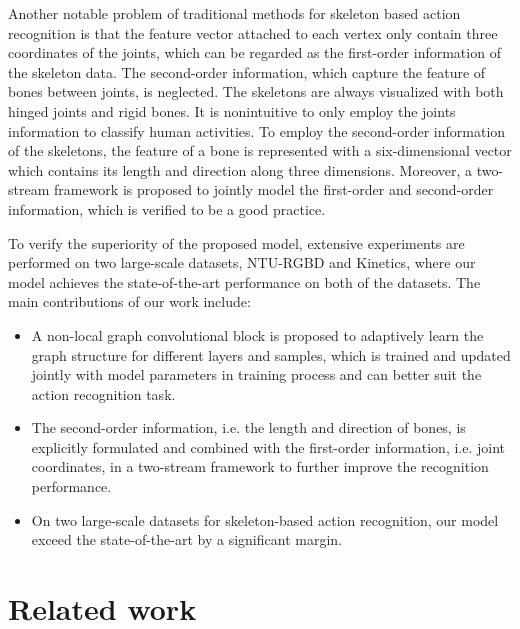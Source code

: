 \documentclass[10pt,twocolumn,letterpaper]{article}
\begin{document}
    Another notable problem of traditional methods for skeleton based action recognition is that the feature vector attached to each vertex only contain three coordinates of the joints, which can be regarded as the first-order information of the skeleton data. The second-order information, which capture the feature of bones between joints, is neglected. The skeletons are always visualized with both hinged joints and rigid bones. It is nonintuitive to only employ the joints information to classify human activities. 
    To employ the second-order information of the skeletons, the feature of a bone is represented with a six-dimensional vector which contains its length and direction along three dimensions. Moreover, a two-stream framework is proposed to jointly model the first-order and second-order information, which is verified to be a good practice.
    
    To verify the superiority of the proposed model, extensive experiments are performed on two large-scale datasets, NTU-RGBD\cite{shahroudy_ntu_2016} and Kinetics\cite{kay_kinetics_2017}, where our model achieves the state-of-the-art performance on both of the datasets.
    The main contributions of our work include:
    \begin{itemize}
        \item A non-local graph convolutional block is proposed to adaptively learn the graph structure for different layers and samples, which is trained and updated jointly with model parameters in training process and can better suit the action recognition task.
        \item The second-order information, i.e. the length and direction of bones, is explicitly formulated and combined with the first-order information, i.e. joint coordinates, in a two-stream framework to further improve the recognition performance.
        \item On two large-scale datasets for skeleton-based action recognition, our model exceed the state-of-the-art by a significant margin. \end{itemize}      
    
	\section{Related work}
    \label{sec:relatedwork}
\end{document}
